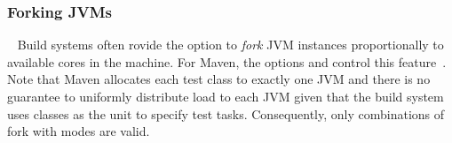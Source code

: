\subsubsection*{Forking JVMs}~
Build systems often rovide the option to \emph{fork} JVM instances
proportionally to available cores in the machine.  For Maven, the
options  and  control this
feature~\cite{fork-and-parallel-execution-maven}.  Note that Maven
allocates each test class to exactly one JVM and there is no guarantee
to uniformly distribute load to each JVM given that the build system
uses classes as the unit to specify test tasks.  Consequently, only
combinations of fork with modes  are valid.

